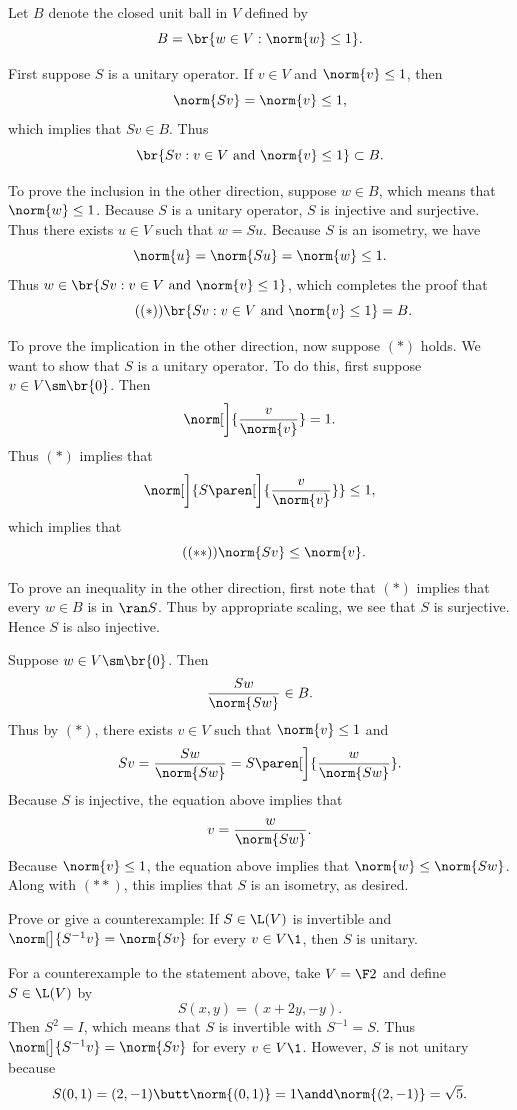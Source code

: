 \begin{Solution}
Let $B$ denote the closed unit ball in $V$ defined by
\[
B = \br{ w \in V: \norm{w} \le 1}.
\]

First suppose $S$ is a unitary operator. If $v \in V$ and $\norm{v} \le 1$, then
\[
\norm{Sv} = \norm{v} \le 1,
\]
which implies that $Sv \in B$. Thus
\[
\br{ Sv : v \in V \text{ and } \norm{v} \le 1} \subset B.
\]

To prove the inclusion in the other direction, suppose $w \in B$, which means that $\norm{w} \le 1$. Because $S$ is a unitary operator, $S$ is injective and surjective. Thus there exists $u \in V$ such that $w = Su$. Because $S$ is an isometry, we have
\[
\norm{u} = \norm{Su} = \norm{w} \le 1.
\]
Thus $w \in \br{ Sv : v \in V \text{ and } \norm{v} \le 1}$, which completes the proof that
\[ \tag{$(*)$}
\br{ Sv : v \in V \text{ and } \norm{v} \le 1} = B.
\]

To prove the implication in the other direction, now suppose $(*)$ holds. We want to show that $S$ is a unitary operator. To do this, first suppose $v \in V \sm \br{0}$. Then
\[
\norm[\bigg]{ \frac{v}{\norm{v} } } = 1.
\]
Thus $(*)$ implies that
\[
\norm[\bigg]{ S\paren[\bigg]{ \frac{v}{\norm{v}} } } \le 1,
\]
which implies that
\[ \tag{$(**)$}
\norm{Sv} \le \norm{v}.
\]

\pagebreak[3]

To prove an inequality in the other direction, first note that $(*)$ implies that every $w \in B$ is in $\ran S$. Thus by appropriate scaling, we see that $S$ is surjective. Hence $S$ is also injective.

Suppose $w \in V \sm \br{0}$. Then
\[
\frac{Sw}{\norm{Sw}} \in B.
\]
Thus by $(*)$, there exists $v \in V$ such that $\norm{v} \le 1$ and
\[
Sv = \frac{Sw}{\norm{Sw}} = S\paren[\bigg]{ \frac{w}{\norm{Sw} } }.
\]
Because $S$ is injective, the equation above implies that
\[
v = \frac{w}{\norm{Sw}}.
\]
Because $\norm{v} \le 1$, the equation above implies that $\norm{w} \le \norm{Sw}$. Along with $(**)$, this implies that $S$ is an isometry, as desired.
\end{Solution}

\exercise
Prove or give a counterexample: If $S \in \L(V)$ is invertible and \mbox{$\norm[\big]{S^{-1} v} =  \norm{S v}$} for every $v \in V\1$, then $S$ is unitary.

\begin{Solution}
For a counterexample to the statement above, take $V = \F2$ and define $S \in \L(V)$ by
\[
S(x,y) = (x+2y, -y).
\]
Then $S^2 = I$, which means that $S$ is invertible with $S^{-1} = S$. Thus $\norm[\big]{S^{-1} v} =  \norm{S v}$ for every $v \in V\1$. However, $S$ is not unitary because
\[
S(0, 1) = (2,-1) \butt \norm{(0,1)} = 1 \andd \norm{(2,-1)} = \sqrt{5}.
\]
\end{Solution}

